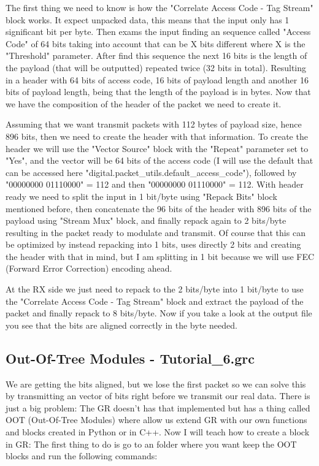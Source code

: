 \documentclass[a4paper, 10pt, conference]{ieeeconf}      %
\begin{document}
    The first thing we need to know is how the "Correlate Access Code - Tag Stream" block works. It expect unpacked data, this means that the input only has 1 significant bit per byte. Then exams the input finding an sequence called "Access Code" of 64 bits taking into account that can be X bits different where X is the "Threshold" parameter. After find this sequence the next 16 bits is the length of the payload (that will be outputted) repeated twice (32 bits in total). Resulting in a header with 64 bits of access code, 16 bits of payload length and another 16 bits of payload length, being that the length of the payload is in bytes. Now that we have the composition of the header of the packet we need to create it.
    
    Assuming that we want transmit packets with 112 bytes of payload size, hence 896 bits, then we need to create the header with that information. 
    To create the header we will use the "Vector Source" block with the "Repeat" parameter set to "Yes", and the vector will be 64 bits of the access code (I will use the default that can be accessed here "digital.packet\_utils.default\_access\_code"), followed by "00000000 01110000" = 112 and then "00000000 01110000" = 112. With header ready we need to split the input in 1 bit/byte using "Repack Bits" block mentioned before, then concatenate the 96 bits of the header with 896 bits of the payload using "Stream Mux" block, and finally repack again to 2 bits/byte resulting in the packet ready to modulate and transmit. Of course that this can be optimized by instead repacking into 1 bits, uses directly 2 bits and creating the header with that in mind, but I am splitting in 1 bit because we will use FEC (Forward Error Correction) encoding ahead.
    
    At the RX side we just need to repack to the 2 bits/byte into 1 bit/byte to use the "Correlate Access Code - Tag Stream" block and extract the payload of the packet and finally repack to 8 bits/byte. Now if you take a look at the output file you see that the bits are aligned correctly in the byte needed.
    
\subsection{Out-Of-Tree Modules - Tutorial\_6.grc}
    We are getting the bits aligned, but we lose the first packet so we can solve this by transmitting an vector of bits right before we transmit our real data. There is just a big problem: The GR doesn't has that implemented but has a thing called OOT (Out-Of-Tree Modules) where allow us extend GR with our own functions and blocks created in Python or in C++. Now I will teach how to create a block in GR: The first thing to do is go to an folder where you want keep the OOT blocks and run the following commands: 
\end{document}
